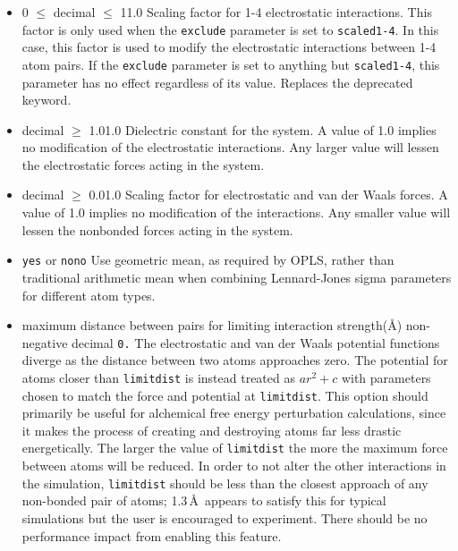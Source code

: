 \begin{itemize}
\item
{}
{0 $\leq$ decimal $\leq$ 1}{1.0}
{Scaling factor for 1-4 electrostatic interactions.
This factor is only used when the
{\tt exclude} parameter is set to {\tt scaled1-4}.  In this case, this
factor is used to modify the electrostatic interactions between 1-4 atom
pairs.  If the {\tt exclude} parameter is set to anything but 
{\tt scaled1-4}, this parameter has no effect regardless of its value.
Replaces the deprecated \texttt{} keyword.}

\item
{}
{decimal $\geq$ 1.0}{1.0}
{Dielectric constant for the system.  A value of 1.0 implies no modification
of the electrostatic interactions.  Any larger value will lessen the
electrostatic forces acting in the system.}

\item
{}
{decimal $\geq$ 0.0}{1.0}
{Scaling factor for electrostatic and van der Waals forces.
A value of 1.0 implies no modification of the interactions.
Any smaller value will lessen the
nonbonded forces acting in the system.}

\item
{}
{{\tt yes} or {\tt no}}{{\tt no}}
{Use geometric mean, as required by  OPLS, rather than
traditional arithmetic mean when combining Lennard-Jones sigma parameters
for different atom types.}

\item
{}
{maximum distance between pairs for limiting interaction strength(\AA)}
{non-negative decimal}
{{\tt 0.}}
{%
The electrostatic and van der Waals potential functions diverge
as the distance between two atoms approaches zero.
The potential for atoms closer than {\tt limitdist} is instead
treated as $a r^2 + c$ with parameters chosen to match the
force and potential at {\tt limitdist}.
This option should primarily be useful for alchemical free energy
perturbation calculations, since it makes the process of creating
and destroying atoms far less drastic energetically.
The larger the value of {\tt limitdist} the more the maximum force
between atoms will be reduced.
In order to not alter the other interactions in the simulation,
{\tt limitdist} should be less than the closest approach
of any non-bonded pair of atoms; 1.3\,\AA\ appears to satisfy this
for typical simulations but the user is encouraged to experiment.
There should be no performance impact from enabling this feature.
}


\end{itemize}
